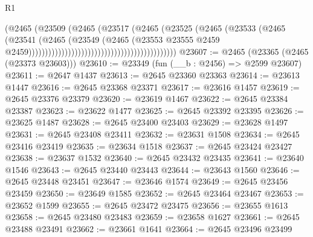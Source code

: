 \begin{lexlean}{R1}
\begin{coremodule}
                                                                  (@2465
                                                                    (@23509
                                                                      (@2465
                                                                        (@23517
                                                                          (@2465
                                                                            (@23525
                                                                              (@2465
                                                                                (@23533
                                                                                  (@2465
                                                                                    (@23541
                                                                                      (@2465
                                                                                        (@23549
                                                                                          (@2465
                                                                                            (@23553
                                                                                              @23555
                                                                                              @2459
                                                                                              @2459)))))))))))))))))))))))))))))))))))))))))))))
@23607 := @2465 (@23365 (@2465 (@23373 @23603)))
@23610 := @23349 (fun (__b : @2456) => @2599 @23607)
@23611 := @2647 @1437
@23613 := @2645 @23360 @23363
@23614 := @23613 @1447
@23616 := @2645 @23368 @23371
@23617 := @23616 @1457
@23619 := @2645 @23376 @23379
@23620 := @23619 @1467
@23622 := @2645 @23384 @23387
@23623 := @23622 @1477
@23625 := @2645 @23392 @23395
@23626 := @23625 @1487
@23628 := @2645 @23400 @23403
@23629 := @23628 @1497
@23631 := @2645 @23408 @23411
@23632 := @23631 @1508
@23634 := @2645 @23416 @23419
@23635 := @23634 @1518
@23637 := @2645 @23424 @23427
@23638 := @23637 @1532
@23640 := @2645 @23432 @23435
@23641 := @23640 @1546
@23643 := @2645 @23440 @23443
@23644 := @23643 @1560
@23646 := @2645 @23448 @23451
@23647 := @23646 @1574
@23649 := @2645 @23456 @23459
@23650 := @23649 @1585
@23652 := @2645 @23464 @23467
@23653 := @23652 @1599
@23655 := @2645 @23472 @23475
@23656 := @23655 @1613
@23658 := @2645 @23480 @23483
@23659 := @23658 @1627
@23661 := @2645 @23488 @23491
@23662 := @23661 @1641
@23664 := @2645 @23496 @23499

\end{coremodule}
\end{lexlean}
